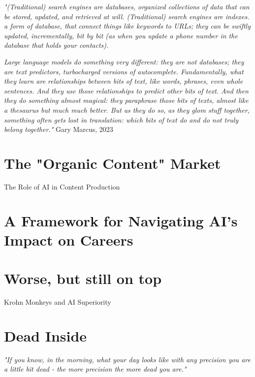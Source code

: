 \textit{"(Traditional) search engines are databases, organized collections of data that can be stored, updated, and retrieved at will. (Traditional) search engines are indexes. a form of database, that connect things like keywords to URLs; they can be swiftly updated, incrementally, bit by bit (as when you update a phone number in the database that holds your contacts).}

\textit{Large language models do something very different: they are not databases; they are text predictors, turbocharged versions of autocomplete. Fundamentally, what they learn are relationships between bits of text, like words, phrases, even whole sentences. And they use those relationships to predict other bits of text. And then they do something almost magical: they paraphrase those bits of texts, almost like a thesaurus but much much better. But as they do so, as they glom stuff together, something often gets lost in translation: which bits of text do and do not truly belong together."} Gary Marcus, 2023 \cite{marcus2023}

\section{The "Organic Content" Market}

The Role of AI in Content Production

\section{A Framework for Navigating AI's Impact on Careers}

\section{Worse, but still on top}

Krohn Monkeys and AI Superiority \cite{KrohnTED}

\section{Dead Inside}

\textit{"If you know, in the morning, what your day looks like with any precision you are a little bit dead - the more precision the more dead you are."}\cite{procrustes}







